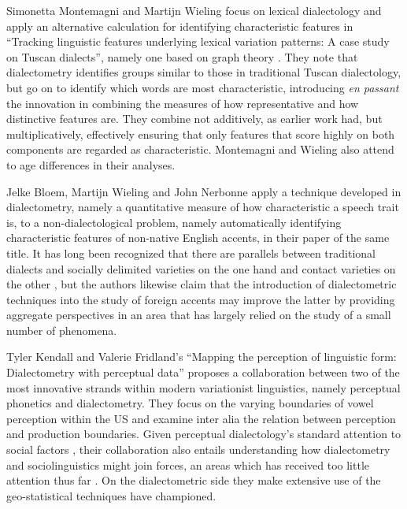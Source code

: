 \documentclass[output=paper]{LSP/langsci}
\begin{document}
Simonetta Montemagni and Martijn Wieling focus on lexical dialectology and apply an alternative calculation for identifying characteristic features in “Tracking linguistic features underlying lexical variation patterns: A case study on Tuscan dialects”, namely one based on graph theory \citep{wieling_bipartite_2011}. They note that dialectometry identifies groups similar to those in traditional Tuscan dialectology, but go on to identify which words are most characteristic, introducing \textit{en passant} the innovation in combining the measures of how representative and how distinctive features are. They combine not additively, as earlier work had, but multiplicatively, effectively ensuring that only features that score highly on both components are regarded as characteristic. Montemagni and Wieling also attend to age differences in their analyses.

Jelke Bloem, Martijn Wieling and John Nerbonne apply a technique developed in dialectometry, namely a quantitative measure of how characteristic a speech trait is, to a non-dialectological problem, namely automatically identifying characteristic features of non-native English accents, in their paper of the same title.  It has long been recognized that there are parallels between traditional dialects and socially delimited varieties on the one hand and contact varieties on the other \citep{trudgill_dialects_1986}, but the authors likewise claim that the introduction of dialectometric techniques into the study of foreign accents may improve the latter by providing aggregate perspectives in an area that has largely relied on the study of a small number of phenomena.

Tyler Kendall and Valerie Fridland’s  “Mapping the perception of linguistic form: Dialectometry with perceptual data” proposes a collaboration between two of the most innovative strands within modern variationist linguistics, namely perceptual phonetics and dialectometry. They focus on the varying boundaries of vowel perception within the US and examine inter alia the relation between perception and production boundaries. Given perceptual dialectology’s standard attention to social factors \citep{niedzielski_effect_1999}, their collaboration also entails understanding how dialectometry and sociolinguistics might join forces, an areas which has received too little attention thus far \citep{nerbonne_measuring_2013}. On the dialectometric side they make extensive use of the geo-statistical techniques \citet{grieve_statistical_2011} have championed.
\end{document}
